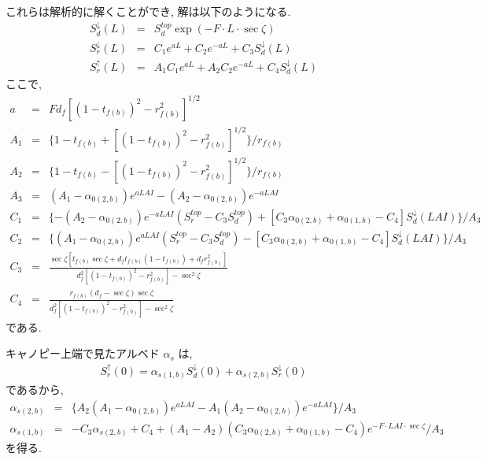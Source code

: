 これらは解析的に解くことができ, 解は以下のようになる. 
\begin{eqnarray}
 S^{\downarrow}_d(L) &=& S^{top}_d \exp(-F\cdot L\cdot \sec\zeta) \\
 S^{\downarrow}_r(L) &=& C_1 e^{a L} + C_2 e^{-a L} + C_3 S^{\downarrow}_d(L) \\
 S^{\uparrow}_r(L)   &=& A_1 C_1 e^{a L} + A_2 C_2 e^{-a L} + C_4 S^{\downarrow}_d(L) 
\end{eqnarray}
ここで, 
\begin{eqnarray}
   a &=& F d_f [(1-t_{f(b)})^2 - r_{f(b)}^2]^{1/2} \label{atn} \\
 A_1 &=& \{ 1 - t_{f(b)} + [(1-t_{f(b)})^2 - r_{f(b)}^2]^{1/2}\} / r_{f(b)} \\
 A_2 &=& \{ 1 - t_{f(b)} - [(1-t_{f(b)})^2 - r_{f(b)}^2]^{1/2}\} / r_{f(b)} \\
 A_3 &=& (A_1 - \alpha_{0(2,b)}) e^{ a LAI }  
        -(A_2 - \alpha_{0(2,b)}) e^{-a LAI } \\
 C_1 &=& \{ -(A_2 - \alpha_{0(2,b)}) e^{-a LAI} (S^{top}_r - C_3 S^{top}_d)
            +[C_3\alpha_{0(2,b)}+\alpha_{0(1,b)}-C_4]S^{\downarrow}_d(LAI)\} / A_3 \\
 C_2 &=& \{  (A_1 - \alpha_{0(2,b)}) e^{ a LAI} (S^{top}_r - C_3 S^{top}_d)
            -[C_3\alpha_{0(2,b)}+\alpha_{0(1,b)}-C_4]S^{\downarrow}_d(LAI)\} / A_3 \\
 C_3 &=& \frac{\sec\zeta[t_{f(b)}\sec\zeta + d_f t_{f(b)}(1-t_{f(b)}) + d_f r_{f(b)}^2]}
              {d_f^2[(1-t_{f(b)})^2-r_{f(b)}^2]-\sec^2\zeta} \\
 C_4 &=& \frac{r_{f(b)}(d_f - \sec\zeta)\sec\zeta}
              {d_f^2[(1-t_{f(b)})^2-r_{f(b)}^2]-\sec^2\zeta}
\end{eqnarray}
である. 

キャノピー上端で見たアルベド $\alpha_s$ は, 
\begin{eqnarray}
 S^{\uparrow}_r(0) = \alpha_{s(1,b)} S^{\downarrow}_d(0)
                   + \alpha_{s(2,b)} S^{\downarrow}_r(0)
\end{eqnarray}
であるから, 
\begin{eqnarray}
 \alpha_{s(2,b)} &=& \{ A_2 ( A_1 - \alpha_{0(2,b)}) e^{ a LAI } 
                      - A_1 ( A_2 - \alpha_{0(2,b)}) e^{-a LAI } 
                   \} / A_3 \\
 \alpha_{s(1,b)} &=& - C_3 \alpha_{s(2,b)} + C_4
                  + ( A_1 - A_2 ) ( C_3 \alpha_{0(2,b)} + \alpha_{0(1,b)} -C_4)
                  e^{- F\cdot LAI\cdot \sec\zeta} / A_3
\end{eqnarray}
を得る. 

